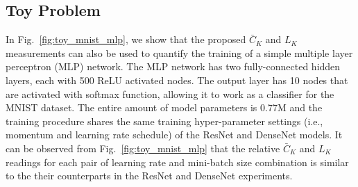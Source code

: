 \documentclass[10pt,journal,compsoc]{IEEEtran}
\begin{document}
\subsection{Toy Problem}

In Fig.~\ref{fig:toy_mnist_mlp}, we show that the proposed $\bar{C}_K$ and $L_K$ measurements can also be used to quantify the training of a simple multiple layer perceptron (MLP) network. 
The MLP network has two fully-connected hidden layers, each with 500 ReLU activated nodes. 
The output layer has 10 nodes that are activated with softmax function, allowing it to work as a classifier for the MNIST dataset.
The entire amount of model parameters is 0.77M and the training procedure shares the same training hyper-parameter settings (i.e., momentum and learning rate schedule) of the ResNet and DenseNet models. 
It can be observed from Fig.~\ref{fig:toy_mnist_mlp} that the relative $\bar{C}_K$ and $L_K$ readings for each pair of learning rate and mini-batch size combination is similar to the their counterparts in the ResNet and DenseNet experiments.


\begin{figure*}
\begin{center}
\end{center}
\caption{The proposed measurements quantifying the training of a toy input-500-500-output MLP network.
}
\label{fig:toy_mnist_mlp}
\end{figure*}
\end{document}
